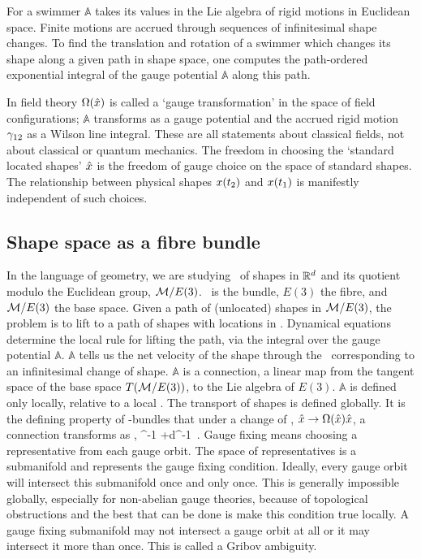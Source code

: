 For a swimmer
$\mathbb{A}$ takes its values in the Lie
algebra of rigid motions in Euclidean space.
Finite motions are accrued through sequences of infinitesimal shape changes.
To find the translation and rotation of
a swimmer which changes its shape along a given path in shape space, one computes
the path-ordered exponential integral of the gauge potential $\mathbb{A}$ along this path.

In field theory
$\Omega(\hat{x})$ is called a `gauge transformation' in the space of field
configurations; $\mathbb{A}$ transforms as a gauge potential and
the accrued rigid motion
$\gamma_{12}$ as a Wilson line integral. These are all statements about
classical fields, not about classical or quantum mechanics. The freedom in choosing the `standard located shapes'
$\hat{x}$ is the freedom of gauge choice on the space of standard
shapes. The relationship between physical shapes $x(t_2)$
and $x(t_1)$ is manifestly independent of such choices.

\subsection{Shape space as a fibre bundle}
\label{sec:shapeFbundle}

In the language of geometry, we are studying \pS\ of shapes in $\mathbb{R}^d$ and
its quotient modulo the Euclidean group, $\mathcal{M}/E(3)$.
\pS\ is the bundle, $E(3)$ the fibre, and $\mathcal{M}/E(3)$ the
base space. Given a path of
(unlocated) shapes in $\mathcal{M}/E(3)$, the problem is to lift to a path of
shapes with locations in \pS. Dynamical equations determine the local rule
for lifting the path, via the integral over the gauge potential $\mathbb{A}$.
$\mathbb{A}$ tells us the net velocity of the shape through the \statesp\
corresponding to an infinitesimal change of shape. $\mathbb{A}$ is a connection, a linear map from the tangent
space of the base space $T (\mathcal{M}/E(3))$, to the Lie algebra of $E(3)$.
$\mathbb{A}$ is defined only locally, relative to a local \slice. The
transport of shapes is defined globally. It is the defining property of
\Group-bundles that under a change of \slice, $\hat{x} \to
\Omega(\hat{x}) \hat{x}$, a connection transforms as
,
\beq
{} \to {}\Omega^{-1}
    +\Omega d\Omega^{-1}
\,.
Gauge fixing means choosing a representative from each gauge orbit. The
space of representatives is a submanifold and represents the gauge fixing
condition. Ideally, every gauge orbit will intersect this submanifold
once and only once. This is generally impossible globally, especially for
non-abelian gauge theories, because of topological obstructions and the
best that can be done is make this condition true locally. A gauge fixing
submanifold may not intersect a gauge orbit at all or it may intersect it
more than once. This is called a Gribov\rf{Gribov77} ambiguity.

